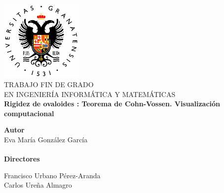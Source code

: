 \begin{titlepage}
 
 
\newlength{\centeroffset}
\setlength{\centeroffset}{-0.5\oddsidemargin}
\addtolength{\centeroffset}{0.5\evensidemargin}
\thispagestyle{empty}

\noindent\hspace*{\centeroffset}\begin{minipage}{\textwidth}

\centering
\includegraphics[width=0.3\textwidth]{imagenes/logougr_new.png}\\[1.4cm]

\textsc{ \Large TRABAJO FIN DE GRADO\\[0.2cm]}
\textsc{ EN INGENIERÍA INFORMÁTICA Y MATEMÁTICAS }\\[1cm]

% 
{\Huge\bfseries Rigidez de ovaloides : Teorema de Cohn-Vossen. Visualización computacional\\
}
\end{minipage}

\vspace{2.5cm}
\noindent\hspace*{\centeroffset}\begin{minipage}{\textwidth}
\centering

\textbf{Autor}\\ {Eva María González García}\\[2.5ex]
${ }$\\
\textbf{Directores}\\
\begin{multicols}{2}
		Francisco Urbano Pérez-Aranda\\
		\columnbreak
Carlos Ureña Almagro
\end{multicols}%

${ }$\\
\begin{multicols}{2}%
           

\end{multicols}
\end{minipage}
\end{titlepage}
